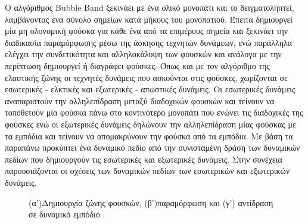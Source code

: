 \bigskip
Ο αλγόριθμος Bubble Band ξεκινάει με ένα ολικό μονοπάτι και το δειγματοληπτεί, λαμβάνοντας ένα σύνολο σημείων κατά μήκους του μονοπατιού. Έπειτα δημιουργεί μία μη ολονομική φούσκα για κάθε ένα από τα επιμέρους σημεία και ξεκινάει την διαδικασία παραμόρφωσης μέσω της άσκησης τεχνητών δυνάμεων, ενώ παράλληλα ελέγχει την συνδετικότητα και αλληλοκάλυψη των φουσκών και ανάλογα με την περίπτωση δημιουργεί ή διαγράφει φούσκες. Όπως και με τον αλγόριθμο της ελαστικής ζώνης οι τεχνητές δυνάμεις που ασκούνται στις φούσκες, χωρίζονται σε εσωτερικές - ελκτικές και εξωτερικές - απωστικές δυνάμεις. Οι εσωτερικές δυνάμεις αναπαριστούν την αλληλεπίδραση μεταξύ διαδοχικών φουσκών και τείνουν να τοποθετούν μία φούσκα πάνω στο κοντινότερο μονοπάτι που ενώνει τις διαδοχικές της φούσκες ενώ οι εξωτερικές δυνάμεις δηλώνουν την αλληλεπίδραση μίας φούσκας με τα εμπόδια και τείνουν να απομακρύνουν την φούσκα από τα εμπόδια. Με βάση τα παραπάνω προκύπτει ένα δυναμικό πεδίο από την συνισταμένη δράση των δυναμικών πεδίων που δημιουργούν τις εσωτερικές και εξωτερικές δυνάμεις. Στην συνέχεια παρουσιάζονται οι σχέσεις των δυναμικών πεδίων των εσωτερικών και εξωτερικών δυνάμεις.

\begin{figure}
	\centering
	\caption{(α')Δημιουργία ζώνης φουσκών, (β')παραμόρφωση και (γ') αντίδραση σε δυναμικό εμπόδιο \cite{dpm}.}
\end{figure}

